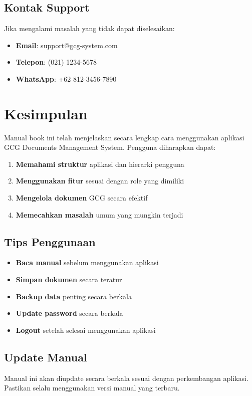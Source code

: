 \documentclass[12pt,a4paper]{article}
\begin{document}
\subsection{Kontak Support}
Jika mengalami masalah yang tidak dapat diselesaikan:
\begin{itemize}
    \item \textbf{Email}: support@gcg-system.com
    \item \textbf{Telepon}: (021) 1234-5678
    \item \textbf{WhatsApp}: +62 812-3456-7890
\end{itemize}

\newpage

\section{Kesimpulan}

Manual book ini telah menjelaskan secara lengkap cara menggunakan aplikasi GCG Documents Management System. Pengguna diharapkan dapat:

\begin{enumerate}
    \item \textbf{Memahami struktur} aplikasi dan hierarki pengguna
    \item \textbf{Menggunakan fitur} sesuai dengan role yang dimiliki
    \item \textbf{Mengelola dokumen} GCG secara efektif
    \item \textbf{Memecahkan masalah} umum yang mungkin terjadi
\end{enumerate}

\subsection{Tips Penggunaan}
\begin{itemize}
    \item \textbf{Baca manual} sebelum menggunakan aplikasi
    \item \textbf{Simpan dokumen} secara teratur
    \item \textbf{Backup data} penting secara berkala
    \item \textbf{Update password} secara berkala
    \item \textbf{Logout} setelah selesai menggunakan aplikasi
\end{itemize}

\subsection{Update Manual}
Manual ini akan diupdate secara berkala sesuai dengan perkembangan aplikasi. Pastikan selalu menggunakan versi manual yang terbaru.
\end{document}
